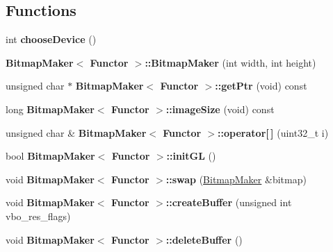 \subsection*{Functions}
\begin{DoxyCompactItemize}
\item 
int {\bfseries choose\+Device} ()\hypertarget{group__api__graphics_ga17e9c55e3efd29a6c7e0705183dab8c5}{}\label{group__api__graphics_ga17e9c55e3efd29a6c7e0705183dab8c5}

\item 
{\bfseries Bitmap\+Maker$<$ Functor $>$\+::\+Bitmap\+Maker} (int width, int height)\hypertarget{group__api__graphics_ga17442bb06bac6120078e6ca3515c309f}{}\label{group__api__graphics_ga17442bb06bac6120078e6ca3515c309f}

\item 
unsigned char $\ast$ {\bfseries Bitmap\+Maker$<$ Functor $>$\+::get\+Ptr} (void) const\hypertarget{group__api__graphics_ga81b12222c93b93230e8552927deb8c77}{}\label{group__api__graphics_ga81b12222c93b93230e8552927deb8c77}

\item 
long {\bfseries Bitmap\+Maker$<$ Functor $>$\+::image\+Size} (void) const\hypertarget{group__api__graphics_gad1a201460b2575a507334385e21ac902}{}\label{group__api__graphics_gad1a201460b2575a507334385e21ac902}

\item 
unsigned char \& {\bfseries Bitmap\+Maker$<$ Functor $>$\+::operator\mbox{[}$\,$\mbox{]}} (uint32\+\_\+t i)\hypertarget{group__api__graphics_ga0bfce0b773f703313106afc3d855ac93}{}\label{group__api__graphics_ga0bfce0b773f703313106afc3d855ac93}

\item 
bool {\bfseries Bitmap\+Maker$<$ Functor $>$\+::init\+GL} ()\hypertarget{group__api__graphics_gac000f27d86706d58a359bde3b24a27f8}{}\label{group__api__graphics_gac000f27d86706d58a359bde3b24a27f8}

\item 
void {\bfseries Bitmap\+Maker$<$ Functor $>$\+::swap} (\hyperlink{class_bitmap_maker}{Bitmap\+Maker} \&bitmap)\hypertarget{group__api__graphics_ga64482b2ced38d7b7ddde58f7d9e0032b}{}\label{group__api__graphics_ga64482b2ced38d7b7ddde58f7d9e0032b}

\item 
void {\bfseries Bitmap\+Maker$<$ Functor $>$\+::create\+Buffer} (unsigned int vbo\+\_\+res\+\_\+flags)\hypertarget{group__api__graphics_gad7017ecfebf64dcc2d6881cf9c80ce39}{}\label{group__api__graphics_gad7017ecfebf64dcc2d6881cf9c80ce39}

\item 
void {\bfseries Bitmap\+Maker$<$ Functor $>$\+::delete\+Buffer} ()\hypertarget{group__api__graphics_gafdd0f7f2fa6b42b1d74158fb82d2ec04}{}\label{group__api__graphics_gafdd0f7f2fa6b42b1d74158fb82d2ec04}

\end{DoxyCompactItemize}
